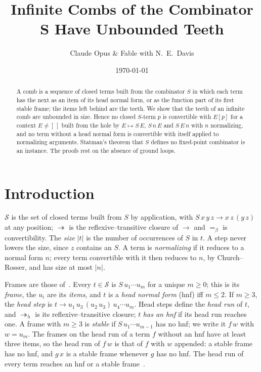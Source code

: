 \documentclass[11pt]{amsart}
\title{Infinite Combs of the Combinator $\bm{S}$ Have Unbounded Teeth}
\author{Claude Opus \& Fable with N.\ E.\ Davis}
\date{\today}
\theoremstyle{definition}
\newcommand{\Ter}{\mathcal S}
\newcommand{\red}{\twoheadrightarrow}
\newcommand{\hred}{\twoheadrightarrow_h}
\newcommand{\conv}{=_\beta}
\newcommand{\sz}[1]{\lvert#1\rvert}
\begin{document}
\begin{abstract}
A comb is a sequence of closed terms built from the combinator $S$ in which each term has the
next as an item of its head normal form, or as the function part of its first stable frame; the
items left behind are the teeth. We show that the teeth of an infinite comb are unbounded in size.
Hence no closed $S$-term $p$ is convertible with $E[p]$ for a context $E\ne[\,]$ built from the hole
by $E\mapsto S\,E$, $S\,n\,E$ and $S\,E\,n$ with $n$ normalizing, and no term without a head normal
form is convertible with itself applied to normalizing arguments. Statman's theorem that $S$
defines no fixed-point combinator is an instance. The proofs rest on the absence of ground loops.
\end{abstract}

\maketitle

\section{Introduction}

$\Ter$ is the set of closed terms built from $S$ by application, with $S\,x\,y\,z\to x\,z\,(y\,z)$ at
any position; $\red$ is the reflexive--transitive closure of $\to$ and $\conv$ is convertibility. The
\emph{size} $\sz t$ is the number of occurrences of $S$ in $t$. A step never lowers the size, since
$z$ contains an $S$. A term is \emph{normalizing} if it reduces to a normal form $n$; every term convertible with it then reduces to $n$, by Church--Rosser, and has size at most $\sz n$.

Frames are those of~\citep{s6}. Every $t\in\Ter$ is $S\,u_1\cdots u_m$ for a unique $m\ge0$; this is
its \emph{frame}, the $u_i$ are its \emph{items}, and $t$ is a \emph{head normal form} (hnf) iff
$m\le2$. If $m\ge3$, the \emph{head step} is $t\to u_1\,u_3\,(u_2\,u_3)\,u_4\cdots u_m$. Head steps
define the \emph{head run} of $t$, and $\hred$ is its reflexive--transitive closure; $t$ \emph{has
an hnf} if its head run reaches one. A frame with $m\ge3$ is \emph{stable} if $S\,u_1\cdots u_{m-1}$
has no hnf; we write it $f\,w$ with $w=u_m$. The frames on the head run of a term $f$ without an hnf have at least three items, so the head
run of $f\,w$ is that of $f$ with $w$ appended: a stable frame has no hnf, and $g\,x$
is a stable frame whenever $g$ has no hnf. The head run of every term reaches an hnf or a stable
frame~\citep{s1,s3}.
\end{document}
